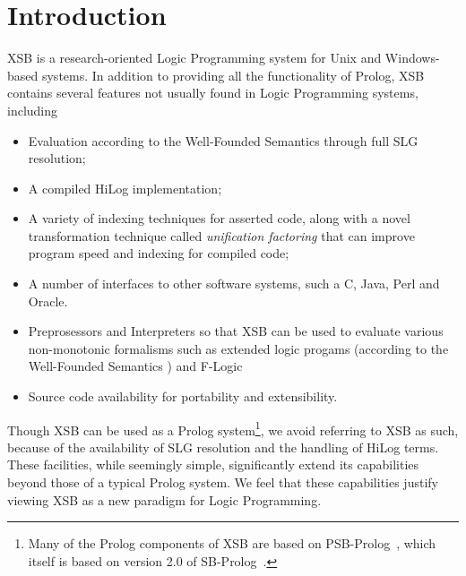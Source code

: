 \chapter{Introduction} \label{introduction}

XSB is a research-oriented Logic Programming system for Unix and
Windows-based systems.  In addition to providing all the
functionality of Prolog, XSB contains several features not usually
found in Logic Programming systems, including
\begin{itemize}
\item Evaluation according to the Well-Founded Semantics \cite{VGRS91}
	through full SLG resolution; 
\item A compiled HiLog implementation;
\item A variety of indexing techniques for asserted code, along
      with a novel transformation technique called {\em unification
      factoring} that can improve program speed and indexing for
      compiled code;
\item A number of interfaces to other software systems, such a C,
	Java, Perl and Oracle. 
\item Preprosessors and Interpreters so that XSB can be used to
evaluate various non-monotonic formalisms such as extended logic
progams (according to the Well-Founded Semantics \cite{ADP94}) and
F-Logic \cite{KLW93} 
\item Source code availability for portability and extensibility.
\end{itemize}
 
Though XSB can be used as a Prolog system\footnote{Many of the Prolog
components of XSB are based on PSB-Prolog~\cite{Xu90}, which itself is
based on version 2.0 of SB-Prolog~\cite{Debr88}.}, we avoid referring
to XSB as such, because of the availability of SLG resolution and the
handling of HiLog terms.  These facilities, while seemingly simple,
significantly extend its capabilities beyond those of a typical Prolog
system. We feel that these capabilities justify viewing XSB as a new
paradigm for Logic Programming.

